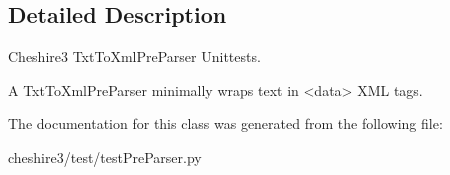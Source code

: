 \subsection{Detailed Description}
\begin{DoxyVerb}Cheshire3 TxtToXmlPreParser Unittests.

A TxtToXmlPreParser minimally wraps text in <data> XML tags.
\end{DoxyVerb}
 

The documentation for this class was generated from the following file\-:\begin{DoxyCompactItemize}
\item 
cheshire3/test/test\-Pre\-Parser.\-py\end{DoxyCompactItemize}
